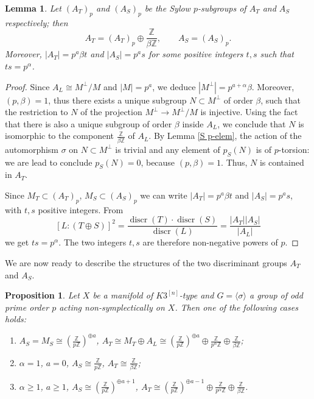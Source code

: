 \documentclass{amsart}
\newtheorem{prop}[theorem]{Proposition}
\newtheorem{lemma}[theorem]{Lemma}
\theoremstyle{definition}
\newcommand{\ra}{\rightarrow}
\newcommand{\IZ}{\mathbb{Z}}
\newcommand{\hskn}{K3^{\left[n\right]}}
\DeclareMathOperator{\discr}{discr}
\begin{document}
\begin{lemma}\label{sylow structure}
Let $(A_T)_p$ and $(A_S)_p$ be the Sylow $p$-subgroups of $A_T$ and $A_S$ respectively; then
\[A_T = (A_T)_p \oplus \frac{\IZ}{\beta \IZ}, \qquad A_S = (A_S)_p.\]
Moreover, $\left| A_T \right|= p^a \beta t$ and $\left| A_S \right|= p^a s$ for some positive integers $t,s$ such that $ts = p^\alpha$.
\end{lemma}

\begin{proof}
Since $A_L \cong M^\perp/M$ and $\left| M \right| = p^a$, we deduce $\left| M^\perp \right| = p^{a + \alpha}\beta$. Moreover, $(p,\beta) = 1$, thus there exists a unique subgroup $N \subset M^\perp$ of order $\beta$, such that the restriction to $N$ of the projection $M^\perp \ra M^\perp/M$ is injective. Using the fact that there is also a unique subgroup of order $\beta$ inside $A_L$, we conclude that $N$ is isomorphic to the component $\frac{\IZ}{\beta \IZ}$ of $A_L$. By Lemma \ref{S p-elem}, the action of the automorphism $\sigma$ on $N \subset M^\perp$ is trivial and any element of $p_S(N)$ is of $p$-torsion: we are lead to conclude $p_S(N) = 0$, because $(p,\beta)=1$. Thus, $N$ is contained in $A_T$.

Since $M_T \subset (A_T)_p$, $M_S \subset (A_S)_p$ we can write $\left| A_T \right|= p^a \beta t$ and $\left| A_S \right|= p^a s$, with $t,s$ positive integers. From
\[\left[ L : (T \oplus S)\right]^2 = \frac{\discr(T) \cdot \discr(S)}{\discr(L)} = \frac{\left| A_T \right| \left|A_S \right|}{\left| A_L \right|}\]
\noindent we get $ts = p^\alpha$. The two integers $t,s$ are therefore non-negative powers of $p$.
\end{proof}

We are now ready to describe the structures of the two discriminant groups $A_T$ and $A_S$.

\begin{prop}\label{discriminant groups structure}
Let $X$ be a manifold of $\hskn$-type and $G = \langle \sigma \rangle$ a group of odd prime order $p$ acting non-symplectically on $X$. Then one of the following cases holds:
\begin{enumerate}
\item[\textit{(i)}] $A_S = M_S \cong \left(\frac{\IZ}{p \IZ}\right)^{\oplus a}$, $A_T \cong M_T \oplus A_L \cong \left(\frac{\IZ}{p \IZ}\right)^{\oplus a} \oplus \frac{\IZ}{p^\alpha \IZ} \oplus \frac{\IZ}{\beta \IZ}$;
\item[\textit{(ii)}] $\alpha = 1$, $a=0$, $A_S \cong \frac{\IZ}{p \IZ}$, $A_T \cong \frac{\IZ}{\beta \IZ}$;
\item[\textit{(iii)}] $\alpha \geq 1$, $a \geq 1$, $A_S \cong \left(\frac{\IZ}{p \IZ}\right)^{\oplus a+1}$, $A_T \cong \left(\frac{\IZ}{p \IZ}\right)^{\oplus a-1} \oplus \frac{\IZ}{p^\alpha \IZ} \oplus \frac{\IZ}{\beta \IZ}$.
\end{enumerate}
\end{prop}
\end{document}
